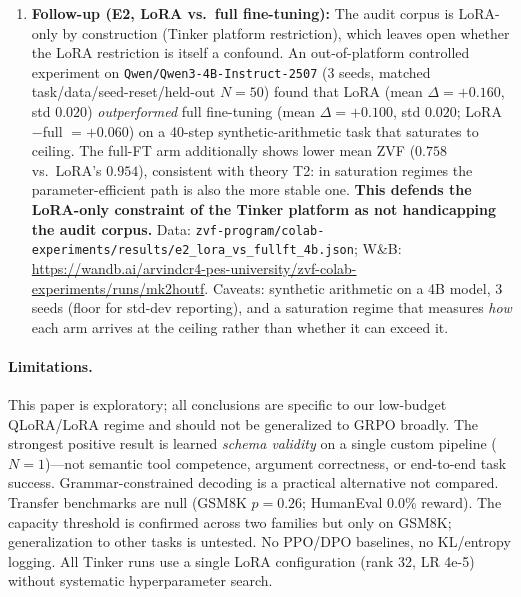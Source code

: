 \documentclass{article}
\begin{document}
\begin{enumerate}
    \item \textbf{Follow-up (E2, LoRA vs.\ full fine-tuning):} The audit corpus is LoRA-only by construction (Tinker platform restriction), which leaves open whether the LoRA restriction is itself a confound. An out-of-platform controlled experiment on \texttt{Qwen/Qwen3-4B-Instruct-2507} (3 seeds, matched task/data/seed-reset/held-out $N{=}50$) found that LoRA (mean $\Delta{=}+0.160$, std $0.020$) \emph{outperformed} full fine-tuning (mean $\Delta{=}+0.100$, std $0.020$; LoRA$-$full $= +0.060$) on a 40-step synthetic-arithmetic task that saturates to ceiling. The full-FT arm additionally shows lower mean ZVF ($0.758$ vs.\ LoRA's $0.954$), consistent with theory T2: in saturation regimes the parameter-efficient path is also the more stable one. \textbf{This defends the LoRA-only constraint of the Tinker platform as not handicapping the audit corpus.} Data: \texttt{zvf-program/colab-experiments/results/e2\_lora\_vs\_fullft\_4b.json}; W\&B: \url{https://wandb.ai/arvindcr4-pes-university/zvf-colab-experiments/runs/mk2houtf}. Caveats: synthetic arithmetic on a 4B model, 3 seeds (floor for std-dev reporting), and a saturation regime that measures \emph{how} each arm arrives at the ceiling rather than whether it can exceed it.
\end{enumerate}

\paragraph{Limitations.} This paper is exploratory; all conclusions are specific to our low-budget QLoRA/LoRA regime and should not be generalized to GRPO broadly. The strongest positive result is learned \emph{schema validity} on a single custom pipeline ($N{=}1$)---not semantic tool competence, argument correctness, or end-to-end task success. Grammar-constrained decoding is a practical alternative not compared. Transfer benchmarks are null (GSM8K $p{=}0.26$; HumanEval 0.0\% reward). The capacity threshold is confirmed across two families but only on GSM8K; generalization to other tasks is untested. No PPO/DPO baselines, no KL/entropy logging. All Tinker runs use a single LoRA configuration (rank 32, LR 4e-5) without systematic hyperparameter search.
\end{document}
